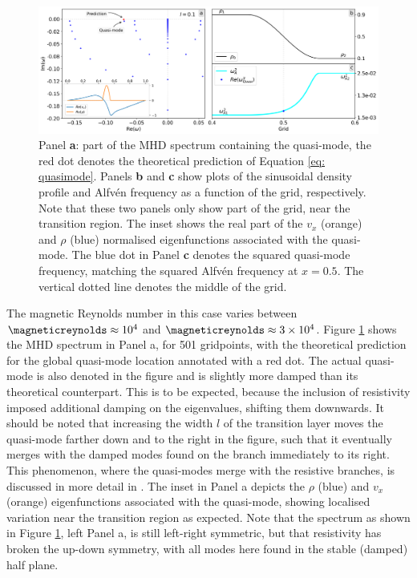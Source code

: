 \begin{figure}[t]
  \centering
  \includegraphics[width=\textwidth]{quasimodes.png}
  \caption{
    Panel \textbf{a}: part of the MHD spectrum containing the quasi-mode, the red dot denotes the theoretical prediction of Equation \eqref{eq: quasimode}. Panels \textbf{b} and \textbf{c} show plots of the sinusoidal density profile and Alfv\'en frequency as a function of the grid, respectively. Note that these two panels only show part of the grid, near the transition region. The inset shows the real part of the $v_x$ (orange) and $\rho$ (blue) normalised eigenfunctions associated with the quasi-mode. The blue dot in Panel \textbf{c} denotes the squared quasi-mode frequency, matching the squared Alfv\'en frequency at $x = 0.5$. The vertical dotted line denotes the middle of the grid.
  }
  \label{fig: quasimodes}
\end{figure}


The magnetic Reynolds number in this case varies between $\magneticreynolds \approx 10^4$ and $\magneticreynolds \approx 3 \times 10^4$. Figure \ref{fig: quasimodes} shows the MHD spectrum in Panel a, for 501 gridpoints, with the theoretical prediction for the global quasi-mode location annotated with a red dot. The actual quasi-mode is also denoted in the figure and is slightly more damped than its theoretical counterpart. This is to be expected, because the inclusion of resistivity imposed additional damping on the eigenvalues, shifting them downwards. It should be noted that increasing the width $l$ of the transition layer moves the quasi-mode farther down and to the right in the figure, such that it eventually merges with the damped modes found on the branch immediately to its right. This phenomenon, where the quasi-modes merge with the resistive branches, is discussed in more detail in \citet{vandoorsselaere2007}. The inset in Panel a depicts the $\rho$ (blue) and $v_x$ (orange) eigenfunctions associated with the quasi-mode, showing localised variation near the transition region as expected. Note that the spectrum as shown in Figure \ref{fig: quasimodes}, left Panel a, is still left-right symmetric, but that resistivity has broken the up-down symmetry, with all modes here found in the stable (damped) half plane.


